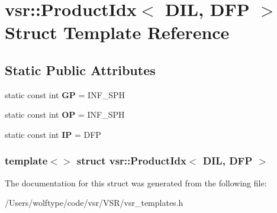 \hypertarget{structvsr_1_1_product_idx_3_01_d_i_l_00_01_d_f_p_01_4}{\section{vsr\-:\-:Product\-Idx$<$ D\-I\-L, D\-F\-P $>$ Struct Template Reference}
\label{structvsr_1_1_product_idx_3_01_d_i_l_00_01_d_f_p_01_4}
}
\subsection*{Static Public Attributes}
\begin{DoxyCompactItemize}
\item 
\hypertarget{structvsr_1_1_product_idx_3_01_d_i_l_00_01_d_f_p_01_4_a8516b74db24882e4c725510ccc5a9594}{static const int {\bfseries G\-P} = I\-N\-F\-\_\-\-S\-P\-H}\label{structvsr_1_1_product_idx_3_01_d_i_l_00_01_d_f_p_01_4_a8516b74db24882e4c725510ccc5a9594}

\item 
\hypertarget{structvsr_1_1_product_idx_3_01_d_i_l_00_01_d_f_p_01_4_a3d1aa978a527ebf779b874ea80b2df9f}{static const int {\bfseries O\-P} = I\-N\-F\-\_\-\-S\-P\-H}\label{structvsr_1_1_product_idx_3_01_d_i_l_00_01_d_f_p_01_4_a3d1aa978a527ebf779b874ea80b2df9f}

\item 
\hypertarget{structvsr_1_1_product_idx_3_01_d_i_l_00_01_d_f_p_01_4_a1cbb420fd56ca3d847a87cd0f154a959}{static const int {\bfseries I\-P} = D\-F\-P}\label{structvsr_1_1_product_idx_3_01_d_i_l_00_01_d_f_p_01_4_a1cbb420fd56ca3d847a87cd0f154a959}

\end{DoxyCompactItemize}
\subsubsection*{template$<$$>$ struct vsr\-::\-Product\-Idx$<$ D\-I\-L, D\-F\-P $>$}



The documentation for this struct was generated from the following file\-:\begin{DoxyCompactItemize}
\item 
/\-Users/wolftype/code/vsr/\-V\-S\-R/vsr\-\_\-templates.\-h\end{DoxyCompactItemize}

